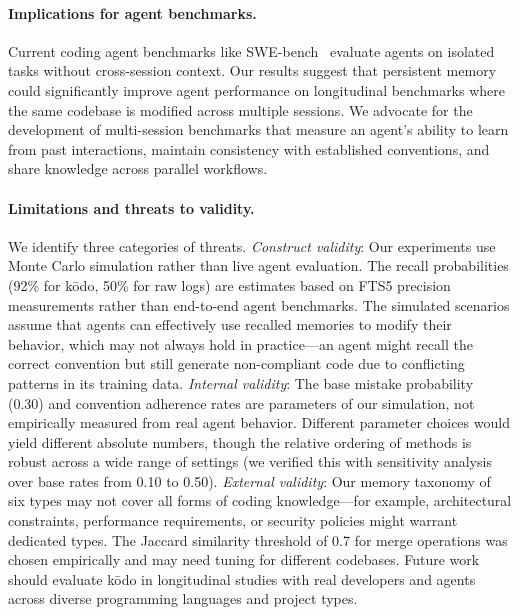 \documentclass{article}
\begin{document}
\paragraph{Implications for agent benchmarks.} Current coding agent benchmarks like SWE-bench~\cite{jimenez2024swebench} evaluate agents on isolated tasks without cross-session context. Our results suggest that persistent memory could significantly improve agent performance on longitudinal benchmarks where the same codebase is modified across multiple sessions. We advocate for the development of multi-session benchmarks that measure an agent's ability to learn from past interactions, maintain consistency with established conventions, and share knowledge across parallel workflows.

\paragraph{Limitations and threats to validity.} We identify three categories of threats. \emph{Construct validity}: Our experiments use Monte Carlo simulation rather than live agent evaluation. The recall probabilities (92\% for k\=odo, 50\% for raw logs) are estimates based on FTS5 precision measurements rather than end-to-end agent benchmarks. The simulated scenarios assume that agents can effectively use recalled memories to modify their behavior, which may not always hold in practice---an agent might recall the correct convention but still generate non-compliant code due to conflicting patterns in its training data. \emph{Internal validity}: The base mistake probability (0.30) and convention adherence rates are parameters of our simulation, not empirically measured from real agent behavior. Different parameter choices would yield different absolute numbers, though the relative ordering of methods is robust across a wide range of settings (we verified this with sensitivity analysis over base rates from 0.10 to 0.50). \emph{External validity}: Our memory taxonomy of six types may not cover all forms of coding knowledge---for example, architectural constraints, performance requirements, or security policies might warrant dedicated types. The Jaccard similarity threshold of 0.7 for merge operations was chosen empirically and may need tuning for different codebases. Future work should evaluate k\=odo in longitudinal studies with real developers and agents across diverse programming languages and project types.
\end{document}
